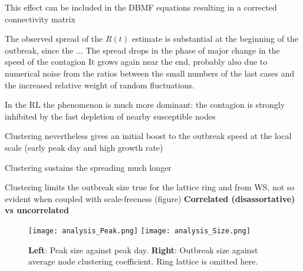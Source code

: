 \documentclass[DIV=12, BCOR=0pt]{scrartcl}  %
\begin{document}
  This effect can be included in the DBMF equations 
  resulting in a corrected connectivity matrix
  
  
  The observed spread of the $R(t)$ estimate is substantial at the beginning of the outbreak, since the ...
  The spread drops in the phase of major change in the speed of the contagion %
  It grows again near the end, probably also due to numerical noise from the ratios between the small numbers of the last cases and the increased relative weight of random fluctuations.
  
  
  In the RL the phenomenon is much more dominant: the contagion is strongly inhibited by the fast depletion of nearby susceptible nodes %
  
  Clustering nevertheless gives an initial boost to the outbreak speed at the local scale (early peak day and high growth rate)
     
  
  
  Clustering sustains the spreading much longer
  
  Clustering limits the outbreak size \citep{PastorSatorras}
  true for the lattice ring and from WS, not so evident when coupled with scale-freeness (figure) \textbf{	Correlated (disassortative) vs uncorrelated}
  
  
	\begin{figure}[h!]
		\centering
		\texttt{[image: analysis\_Peak.png]}
		\texttt{[image: analysis\_Size.png]}
		\caption{\textbf{Left}: Peak size against peak day.
						 \textbf{Right}: Outbreak size against average node clustering coefficient. Ring lattice is omitted here.}
		\label{fig:analysis}
	\end{figure}

 
  
\end{document}
